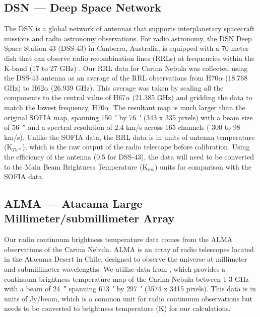 \subsection{DSN --- Deep Space Network}
The DSN is a global network of antennas that supports interplanetary spacecraft missions and radio astronomy observations.
For radio astronomy, the DSN Deep Space Station 43 (DSS-43) in Canberra, Australia, is equipped with a 70-meter dish that can observe radio recombination lines (RRLs) at frequencies within the K-band (17 to 27 GHz) \parencite{virkler2020broadband}.
Our RRL data for Carina Nebula was collected using the DSS-43 antenna as an average of the RRL observations from H70$\alpha$ (18.768 GHz) to H62$\alpha$ (26.939 GHz).
This average was taken by scaling all the components to the central value of H67$\alpha$ (21.385 GHz) and gridding the data to match the lowest frequency, H70$\alpha$.
The resultant map is much larger than the original SOFIA map, spanning \qty{150}{\arcminute} by \qty{76}{\arcminute} (343 x 335 pixels) with a beam size of \qty{56}{\arcsecond} and a spectral resolution of 2.4 km/s across 165 channels (-300 to 98 km/s).
Unlike the SOFIA data, the RRL data is in units of antenna temperature (K$_{Ta*}$), which is the raw output of the radio telescope before calibration.
Using the efficiency of the antenna (0.5 for DSS-43), the data will need to be converted to the Main Beam Brightness Temperature (K$_{mb}$) units for comparison with the SOFIA data.

\subsection{ALMA --- Atacama Large Millimeter/submillimeter Array}
Our radio continuum brightness temperature data comes from the ALMA observations of the Carina Nebula.
ALMA is an array of radio telescopes located in the Atacama Desert in Chile, designed to observe the universe at millimeter and submillimeter wavelengths.
We utilize data from \cite{Rebolledo_2021}, which provides a continuum brightness temperature map of the Carina Nebula between 1-3 GHz with a beam of \qty{24}{\arcsecond} spanning \qty{613}{\arcminute} by \qty{297}{\arcminute} (3574 x 3415 pixels).
This data is in units of Jy/beam, which is a common unit for radio continuum observations but needs to be converted to brightness temperature (K) for our calculations.

